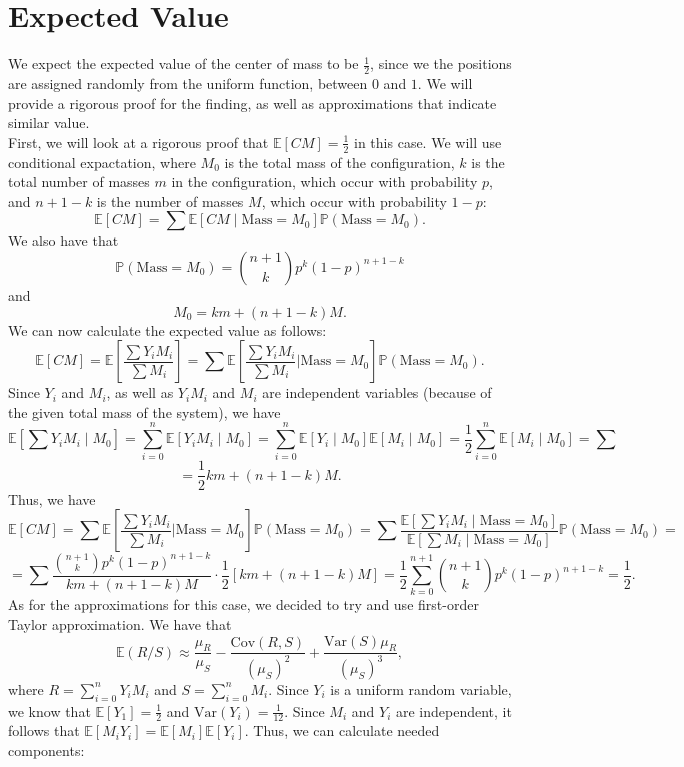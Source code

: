 \documentclass[11pt, twoside, reqno]{book}
\newcommand{\Var}{\text{Var}}
\newcommand{\Cov}{\text{Cov}}
\newcommand{\E}{\mathbb{E}}
\begin{document}
\section{Expected Value}
\label{secB3}
We expect the expected value of the center of mass to be $\frac{1}{2}$, since we the positions are assigned randomly from the uniform function, between $0$ and $1$. We will provide a rigorous proof for the finding, as well as approximations that indicate similar value. \\
First, we will look at a rigorous proof that $\E[CM] = \frac{1}{2}$ in this case. We will use conditional expactation, where $M_{0}$ is the total mass of the configuration, $k$ is the total number of masses $m$ in the configuration, which occur with probability $p$, and $n+1-k$ is the number of masses $M$, which occur with probability $1-p$:
$$\E[CM] = \sum \E[CM \mid \text{Mass} = M_{0}] \mathbb{P}(\text{Mass} = M_{0}).$$
We also have that
$$\mathbb{P}(\text{Mass} = M_{0}) = \binom{n+1}{k} p^{k} (1-p)^{n+1-k}$$ and
$$M_{0} = km+(n+1-k)M.$$
We can now calculate the expected value as follows:
$$\E[CM] = \E\left[\frac{\sum Y_{i}M_{i}}{\sum M_{i}} \right] = \sum \E\left[ \frac{\sum Y_{i}M_{i}}{\sum M_{i}}  \Bigg| \text{Mass} = M_{0} \right] \mathbb{P} (\text{Mass} = M_{0}).$$
Since $Y_{i}$ and $M_{i}$, as well as $Y_{i}M_{i}$ and $M_{i}$ are independent variables (because of the given total mass of the system), we have
$$\E\left[\sum Y_{i} M_{i} \mid M_{0}\right] = \sum^{n}_{i=0} \E[Y_{i}M_{i} \mid M_{0}] = \sum^{n}_{i=0} \E[Y_{i} \mid M_{0}] \E[M_{i} \mid M_{0}] = \frac{1}{2}\sum^{n}_{i=0} \E[M_{i} \mid M_{0}] = \sum $$
$$=\frac{1}{2} km+(n+1-k)M.$$
Thus, we have 
$$\E[CM] =\sum \E\left[ \frac{\sum Y_{i}M_{i}}{\sum M_{i}}  \Bigg| \text{Mass} = M_{0} \right] \mathbb{P} (\text{Mass} = M_{0}) = \sum \frac{\E\left[ \sum Y_{i}M_{i} \mid \text{Mass} = M_{0} \right]}{\E [\sum M_{i} \mid \text{Mass} = M_{0}] } \mathbb{P} (\text{Mass} = M_{0})=$$
$$=\sum \frac{\binom{n+1}{k}p^{k}(1-p)^{n+1-k}}{km+(n+1-k)M} \cdot \frac{1}{2}[km+(n+1-k)M]=\frac{1}{2} \sum^{n+1}_{k=0}\binom{n+1}{k}p^{k}(1-p)^{n+1-k}=\frac{1}{2}.$$
As for the approximations for this case, we decided to try and use first-order Taylor approximation. We have that
$$\mathbb{E}(R/S) \approx \frac{\mu_{R}}{\mu_{S}} - \frac{\Cov(R, S)}{(\mu_{S})^2}+\frac{\Var(S)\mu_{R}}{(\mu_{S})^{3}},$$
where $R = \sum^{n}_{i=0}Y_{i}M_{i}$ and $S=\sum^{n}_{i=0}M_{i}$. Since $Y_{i}$ is a uniform random variable, we know that $\mathbb{E}[Y_{1}]=\frac{1}{2}$ and $\Var(Y_{i}) = \frac{1}{12}$. Since $M_{i}$ and $Y_{i}$ are independent, it follows that $\mathbb{E}[M_{i}Y_{i}]=\mathbb{E}[M_{i}]\mathbb{E}[Y_{i}]$. Thus, we can calculate needed components:
\end{document}
